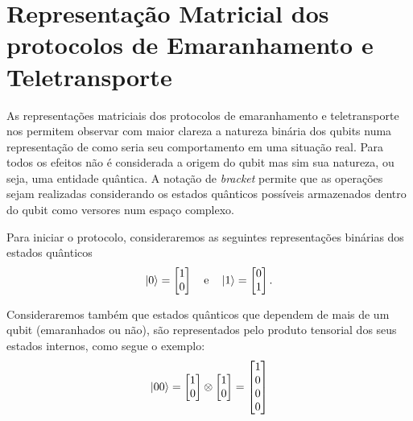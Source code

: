 
\chapter{Representação Matricial dos protocolos de Emaranhamento e Teletransporte}\label{app:matricial}

As representações matriciais dos protocolos de emaranhamento e teletransporte nos permitem observar com maior clareza a natureza binária dos qubits numa representação de como seria seu comportamento em uma situação real. Para todos os efeitos não é considerada a origem do qubit mas sim sua natureza, ou seja, uma entidade quântica. A notação de \textit{bracket} permite que as operações sejam realizadas considerando os estados quânticos possíveis armazenados dentro do qubit como versores num espaço complexo.

Para iniciar o protocolo, consideraremos as seguintes representações binárias dos estados quânticos
\begin{equation} \label{eq:01}
\ket{0} = \begin{bmatrix}
1 \\
0
\end{bmatrix} \quad \text{e} \quad
\ket{1} = \begin{bmatrix}
0 \\
1
\end{bmatrix}.
\end{equation}

Consideraremos também que estados quânticos que dependem de mais de um qubit (emaranhados ou não), são representados pelo produto tensorial dos seus estados internos, como segue o exemplo:
\begin{equation}\label{eq:00}
\ket{00} = \begin{bmatrix}
1 \\
0
\end{bmatrix} \otimes \begin{bmatrix}
1 \\
0
\end{bmatrix} = \begin{bmatrix}
1 \\
0 \\
0 \\
0
\end{bmatrix}
\end{equation}

